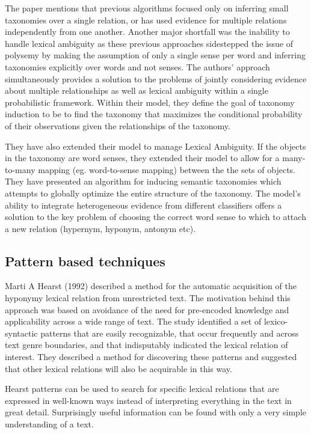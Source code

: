 \documentclass[11pt]{article}
\begin{document}
The paper mentions that previous algorithms focused only on inferring small taxonomies over a single relation, or has used evidence for multiple relations independently from one another. Another major shortfall was the inability to handle lexical ambiguity as these previous approaches sidestepped the issue of polysemy by making the assumption of only a single sense per word and inferring taxonomies explicitly over words and not senses. The authors’ approach simultaneously provides a solution to the problems of jointly considering evidence about multiple relationships as well as lexical ambiguity within a single probabilistic framework. Within their model, they define the goal of taxonomy induction to be to find the taxonomy that maximizes the conditional probability of their observations given the relationships of the taxonomy. 

They have also extended their model to manage Lexical Ambiguity. If the objects in the taxonomy are word senses, they extended their model to allow for a many-to-many mapping (eg. word-to-sense mapping) between the the sets of objects. They have presented an algorithm for inducing semantic taxonomies which attempts to globally optimize the entire structure of the taxonomy. The model’s ability to integrate heterogeneous evidence from different classifiers offers a solution to the key problem of choosing the correct word sense to which to attach a new relation (hypernym, hyponym, antonym etc).

\subsection{Pattern based techniques}
Marti A Hearst (1992) described a method for the automatic acquisition of the hyponymy lexical relation from unrestricted text. The motivation behind this approach was based on avoidance of the need for pre-encoded knowledge and applicability across a wide range of text. The study identified a set of lexico-syntactic patterns that are easily recognizable, that occur frequently and across text genre boundaries, and that indisputably indicated the lexical relation of interest. They described a method for discovering these patterns and suggested that other lexical relations will also
be acquirable in this way. 

Hearst patterns can be used to search for specific lexical relations that are expressed in well-known ways instead of interpreting everything in the text in great detail. Surprisingly useful information can be found with only a very simple understanding of a text.
\end{document}
